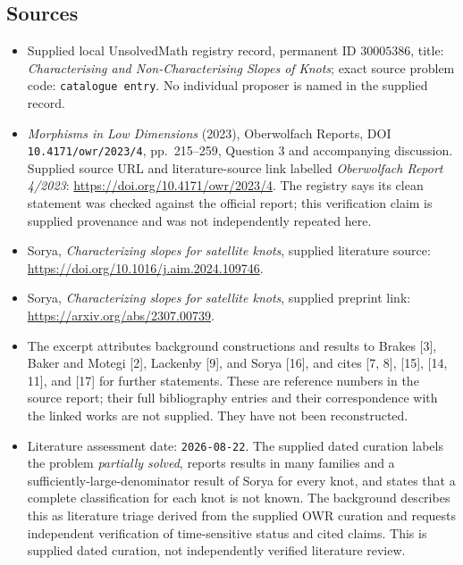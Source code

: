 \documentclass[11pt]{article}
\begin{document}
\subsection{Sources}
\begin{itemize}
\item Supplied local UnsolvedMath registry record, permanent ID \(30005386\), title: \emph{Characterising and Non-Characterising Slopes of Knots}; exact source problem code: \texttt{catalogue entry}. No individual proposer is named in the supplied record.
\item \emph{Morphisms in Low Dimensions} (2023), Oberwolfach Reports, DOI \texttt{10.4171/owr/2023/4}, pp.\ 215--259, Question 3 and accompanying discussion. Supplied source URL and literature-source link labelled \emph{Oberwolfach Report 4/2023}: \url{https://doi.org/10.4171/owr/2023/4}. The registry says its clean statement was checked against the official report; this verification claim is supplied provenance and was not independently repeated here.
\item Sorya, \emph{Characterizing slopes for satellite knots}, supplied literature source: \url{https://doi.org/10.1016/j.aim.2024.109746}.
\item Sorya, \emph{Characterizing slopes for satellite knots}, supplied preprint link: \url{https://arxiv.org/abs/2307.00739}.
\item The excerpt attributes background constructions and results to Brakes [3], Baker and Motegi [2], Lackenby [9], and Sorya [16], and cites [7, 8], [15], [14, 11], and [17] for further statements. These are reference numbers in the source report; their full bibliography entries and their correspondence with the linked works are not supplied. They have not been reconstructed.
\item Literature assessment date: \texttt{2026-08-22}. The supplied dated curation labels the problem \emph{partially solved}, reports results in many families and a sufficiently-large-denominator result of Sorya for every knot, and states that a complete classification for each knot is not known. The background describes this as literature triage derived from the supplied OWR curation and requests independent verification of time-sensitive status and cited claims. This is supplied dated curation, not independently verified literature review.
\end{itemize}
\end{document}
